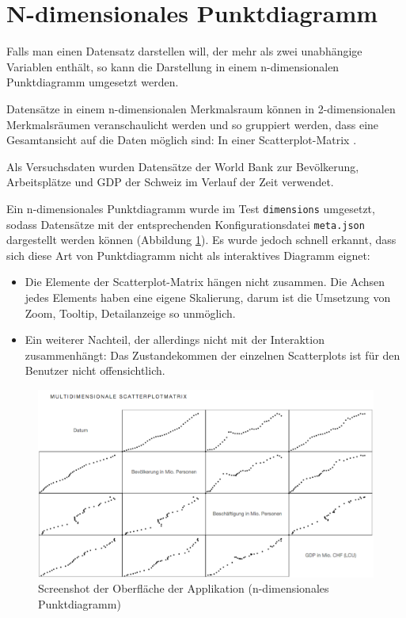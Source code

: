 \section{N-dimensionales Punktdiagramm}

Falls man einen Datensatz darstellen will, der mehr als zwei unabhängige Variablen enthält, so kann die Darstellung in einem n-dimensionalen Punktdiagramm umgesetzt werden.

Datensätze in einem n-dimensionalen Merkmalsraum können in 2-dimensionalen Merkmalsräumen veranschaulicht werden und so gruppiert werden, dass eine Gesamtansicht auf die Daten möglich sind: In einer Scatterplot-Matrix \cite{viz}.

Als Versuchsdaten wurden Datensätze der World Bank \cite{worldbank} zur Bevölkerung, Arbeitsplätze und GDP der Schweiz im Verlauf der Zeit verwendet.

Ein n-dimensionales Punktdiagramm wurde im Test \texttt{dimensions} umgesetzt, sodass Datensätze mit der entsprechenden Konfigurationsdatei \texttt{meta.json} dargestellt werden können (Abbildung \ref{fig:nd}). Es wurde jedoch schnell erkannt, dass sich diese Art von Punktdiagramm nicht als interaktives Diagramm eignet:

\begin{itemize}
	\item Die Elemente der Scatterplot-Matrix hängen nicht zusammen. Die Achsen jedes Elements haben eine eigene Skalierung, darum ist die Umsetzung von Zoom, Tooltip, Detailanzeige so unmöglich.
	\item Ein weiterer Nachteil, der allerdings nicht mit der Interaktion zusammenhängt: Das Zustandekommen der einzelnen Scatterplots ist für den Benutzer nicht offensichtlich.
\end{itemize}

\begin{figure}[!htbp]
	\centering
	\includegraphics[width=\linewidth]{images/nd}
	\caption{Screenshot der Oberfläche der Applikation (n-dimensionales Punktdiagramm)}
	\label{fig:nd}
\end{figure}
